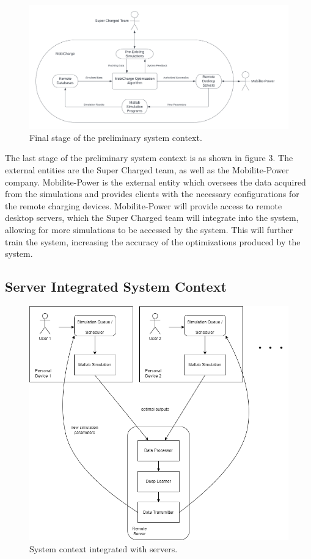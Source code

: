 \documentclass[12pt, titlepage]{article}
\begin{document}
\newpage
\begin{figure}[h]
    \centering
    \includegraphics[width=15cm]{images/context2.png}
    \caption[Prelim System Contexts 3]{Final stage of the preliminary system context.}
    \label{fig:figure3}
\end{figure}
The last stage of the preliminary system context is as shown in figure 3. The external entities are the Super Charged team, as well as the Mobilite-Power company. Mobilite-Power is the external entity which oversees the data acquired from the simulations and provides clients with the necessary configurations for the remote charging devices. Mobilite-Power will provide access to remote desktop servers, which the Super Charged team will integrate into the system, allowing for more simulations to be accessed by the system. This will further train the system, increasing the accuracy of the optimizations produced by the system.


\newpage
\subsection{Server Integrated System Context}

\begin{figure}[h]
    \centering
    \includegraphics[width=15cm]{images/server_system.png}
    \caption[Server-Int System Contexts 1]{System context integrated with servers.}
    \label{fig:figure4}
\end{figure}
\end{document}
